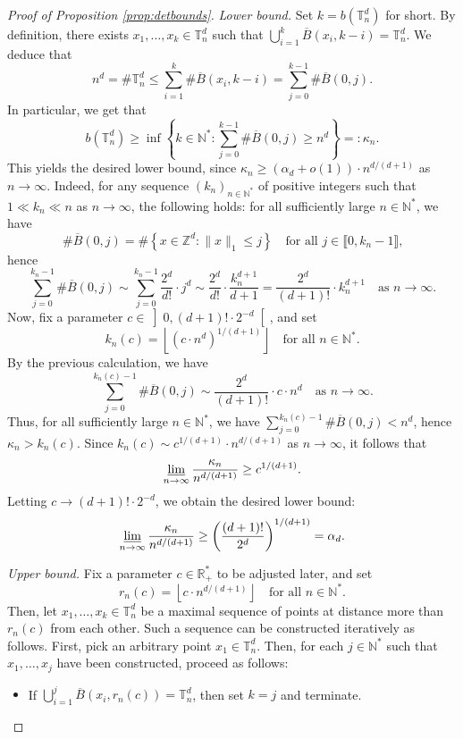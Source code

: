 \documentclass[a4paper,11pt]{article}
\begin{document}
\begin{proof}[Proof of Proposition \ref{prop:detbounds}]
\emph{Lower bound.}
Set $k=b\left(\mathbb{T}_n^d\right)$ for short.
By definition, there exists $x_1,\ldots,x_k\in\mathbb{T}_n^d$ such that $\bigcup_{i=1}^k\overline{B}(x_i,k-i)=\mathbb{T}_n^d$.
We deduce that
\[n^d=\#\mathbb{T}_n^d\leq\sum_{i=1}^k\#\overline{B}(x_i,k-i)=\sum_{j=0}^{k-1}\#\overline{B}(0,j).\]
In particular, we get that
\[b\left(\mathbb{T}_n^d\right)\geq\inf\left\{k\in\mathbb{N}^*:\sum_{j=0}^{k-1}\#\overline{B}(0,j)\geq n^d\right\}=:\kappa_n.\]
This yields the desired lower bound, since $\kappa_n\geq(\alpha_d+o(1))\cdot n^{d/(d+1)}$ as $n\to\infty$.
Indeed, for any sequence $(k_n)_{n\in\mathbb{N}^*}$ of positive integers such that $1\ll k_n\ll n$ as $n\to\infty$, the following holds: for all sufficiently large $n\in\mathbb{N}^*$, we have
\[\#\overline{B}(0,j)=\#\left\{x\in\mathbb{Z}^d:\|x\|_1\leq j\right\}\quad\text{for all $j\in\llbracket0,k_n-1\rrbracket$,}\]
hence
\[\sum_{j=0}^{k_n-1}\#\overline{B}(0,j)\sim\sum_{j=0}^{k_n-1}\frac{2^d}{d!}\cdot j^d\sim\frac{2^d}{d!}\cdot\frac{k_n^{d+1}}{d+1}=\frac{2^d}{(d+1)!}\cdot k_n^{d+1}\quad\text{as $n\to\infty$.}\]
Now, fix a parameter $c\in\left]0,(d+1)!\cdot2^{-d}\right[$, and set
\[k_n(c)=\left\lfloor\left(c\cdot n^d\right)^{1/(d+1)}\right\rfloor\quad\text{for all $n\in\mathbb{N}^*$.}\]
By the previous calculation, we have
\[\sum_{j=0}^{k_n(c)-1}\#\overline{B}(0,j)\sim\frac{2^d}{(d+1)!}\cdot c\cdot n^d\quad\text{as $n\to\infty$.}\]
Thus, for all sufficiently large $n\in\mathbb{N}^*$, we have $\sum_{j=0}^{k_n(c)-1}\#\overline{B}(0,j)<n^d$, hence $\kappa_n>k_n(c)$.
Since $k_n(c)\sim c^{1/(d+1)}\cdot n^{d/(d+1)}$ as $n\to\infty$, it follows that
\[\varliminf_{n\to\infty}\frac{\kappa_n}{n^{d/(d+1)}}\geq c^{1/(d+1)}.\]
Letting $c\to(d+1)!\cdot2^{-d}$, we obtain the desired lower bound:
\[\varliminf_{n\to\infty}\frac{\kappa_n}{n^{d/(d+1)}}\geq\left(\frac{(d+1)!}{2^d}\right)^{1/(d+1)}=\alpha_d.\]

\medskip

\emph{Upper bound.}
Fix a parameter $c\in\mathbb{R}_+^*$ to be adjusted later, and set
\[r_n(c)=\left\lfloor c\cdot n^{d/(d+1)}\right\rfloor\quad\text{for all $n\in\mathbb{N}^*$.}\]
Then, let $x_1,\ldots,x_k\in\mathbb{T}_n^d$ be a maximal sequence of points at distance more than $r_n(c)$ from each other.
Such a sequence can be constructed iteratively as follows.
First, pick an arbitrary point $x_1\in\mathbb{T}_n^d$.
Then, for each $j\in\mathbb{N}^*$ such that $x_1,\ldots,x_j$ have been constructed, proceed as follows:
\begin{itemize}
\item If $\bigcup_{i=1}^j\overline{B}(x_i,r_n(c))=\mathbb{T}_n^d$, then set $k=j$ and terminate.


\end{itemize}
\end{proof}
\end{document}

